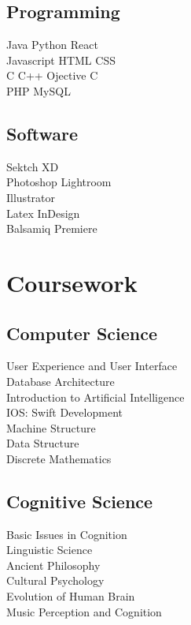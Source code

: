 \documentclass[]{deedy-resume-openfont}
\begin{document}
\begin{minipage}[t]{0.33\textwidth}
\subsection{Programming}
Java \textbullet{} Python \textbullet{} React\\
Javascript \textbullet{} HTML \textbullet{}   CSS \\
C \textbullet{} C++ \textbullet{} Ojective C \\
PHP \textbullet{} MySQL  \\
\sectionsep

\subsection{Software}
Sektch \textbullet{} XD\\
Photoshop \textbullet{} Lightroom\\
Illustrator\\
Latex \textbullet{} InDesign\\
Balsamiq \textbullet{} Premiere\\
\sectionsep


\section{Coursework}

\subsection{Computer Science}
User Experience and User Interface\\
Database Architecture\\
Introduction to Artificial Intelligence\\
IOS: Swift Development\\
Machine Structure\\
Data Structure\\
Discrete Mathematics\\
\sectionsep

\subsection{Cognitive Science}
Basic Issues in Cognition\\
Linguistic Science\\
Ancient Philosophy\\
Cultural Psychology\\
Evolution of Human Brain\\
Music Perception and Cognition\\
\sectionsep





%
%

\end{minipage} 
\end{document}
